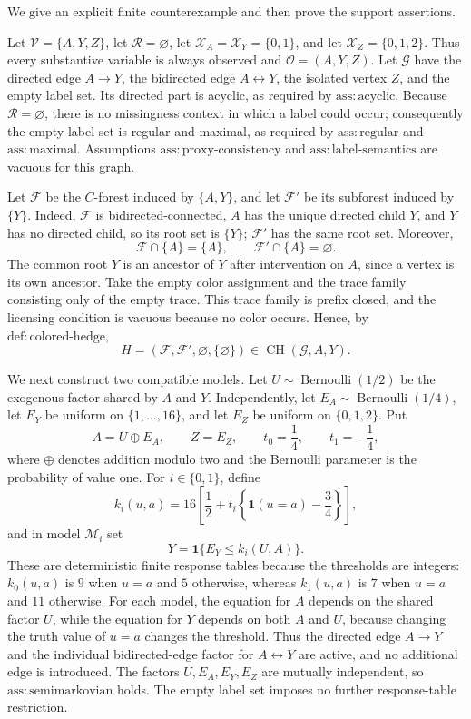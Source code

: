 We give an explicit finite counterexample and then prove the support assertions.

Let \(\mathcal V=\{A,Y,Z\}\), let \(\mathcal R=\varnothing\), let \(\mathcal X_A=\mathcal X_Y=\{0,1\}\), and let \(\mathcal X_Z=\{0,1,2\}\). Thus every substantive variable is always observed and \(\mathcal O=(A,Y,Z)\). Let \(\mathcal G\) have the directed edge \(A\to Y\), the bidirected edge \(A\leftrightarrow Y\), the isolated vertex \(Z\), and the empty label set. Its directed part is acyclic, as required by \(\mathrm{ass{:}acyclic}\). Because \(\mathcal R=\varnothing\), there is no missingness context in which a label could occur; consequently the empty label set is regular and maximal, as required by \(\mathrm{ass{:}regular}\) and \(\mathrm{ass{:}maximal}\). Assumptions \(\mathrm{ass{:}proxy\text{-}consistency}\) and \(\mathrm{ass{:}label\text{-}semantics}\) are vacuous for this graph.

Let \(\mathcal F\) be the \(C\)-forest induced by \(\{A,Y\}\), and let \(\mathcal F'\) be its subforest induced by \(\{Y\}\). Indeed, \(\mathcal F\) is bidirected-connected, \(A\) has the unique directed child \(Y\), and \(Y\) has no directed child, so its root set is \(\{Y\}\); \(\mathcal F'\) has the same root set. Moreover,
\[
 \mathcal F\cap\{A\}=\{A\},
 \qquad
 \mathcal F'\cap\{A\}=\varnothing.
\]
The common root \(Y\) is an ancestor of \(Y\) after intervention on \(A\), since a vertex is its own ancestor. Take the empty color assignment and the trace family consisting only of the empty trace. This trace family is prefix closed, and the licensing condition is vacuous because no color occurs. Hence, by \(\mathrm{def{:}colored\text{-}hedge}\),
\[
 H=(\mathcal F,\mathcal F',\varnothing,\{\varnothing\})
 \in \operatorname{CH}(\mathcal G,A,Y).
\]

We next construct two compatible models. Let \(U\sim\operatorname{Bernoulli}(1/2)\) be the exogenous factor shared by \(A\) and \(Y\). Independently, let \(E_A\sim\operatorname{Bernoulli}(1/4)\), let \(E_Y\) be uniform on \(\{1,\ldots,16\}\), and let \(E_Z\) be uniform on \(\{0,1,2\}\). Put
\[
 A=U\mathbin{\oplus}E_A,
 \qquad
 Z=E_Z,
 \qquad
 t_0=\frac14,
 \qquad
 t_1=-\frac14,
\]
where \(\oplus\) denotes addition modulo two and the Bernoulli parameter is the probability of value one. For \(i\in\{0,1\}\), define
\[
 k_i(u,a)
 =16\left[\frac12+t_i\left\{\mathbf 1(u=a)-\frac34\right\}\right],
\]
and in model \(\mathcal M_i\) set
\[
 Y=\mathbf 1\{E_Y\leq k_i(U,A)\}.
\]
These are deterministic finite response tables because the thresholds are integers: \(k_0(u,a)\) is \(9\) when \(u=a\) and \(5\) otherwise, whereas \(k_1(u,a)\) is \(7\) when \(u=a\) and \(11\) otherwise. For each model, the equation for \(A\) depends on the shared factor \(U\), while the equation for \(Y\) depends on both \(A\) and \(U\), because changing the truth value of \(u=a\) changes the threshold. Thus the directed edge \(A\to Y\) and the individual bidirected-edge factor for \(A\leftrightarrow Y\) are active, and no additional edge is introduced. The factors \(U,E_A,E_Y,E_Z\) are mutually independent, so \(\mathrm{ass{:}semimarkovian}\) holds. The empty label set imposes no further response-table restriction.

